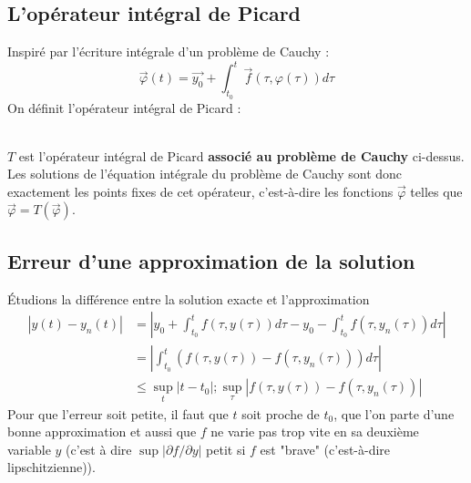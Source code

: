 \subsection{L'opérateur intégral de Picard}
Inspiré par l'écriture intégrale d'un problème de Cauchy :
\begin{equation}
	\vec \varphi(t) = \vec{y_0} + \int_{t_0}^t \vec{f}(\tau,\varphi(\tau))d\tau
\end{equation}
On définit l'opérateur intégral de Picard :
	
\ \\
$T$ est l'opérateur intégral de Picard \textbf{associé au problème de Cauchy}
ci-dessus. Les solutions de l'équation intégrale du problème de Cauchy sont donc 
exactement les points fixes de cet opérateur, c'est-à-dire les fonctions 
$\vec{\varphi}$ telles que $\vec \varphi = T(\vec \varphi)$.
	
\setcounter{subsection}{8}
\subsection{Erreur d'une approximation de la solution}
Étudions la différence entre la solution exacte et l'approximation
\begin{equation}
	\begin{array}{ll}
		|y(t) - y_n(t)| & = |y_0 + \int_{t_0}^t f(\tau,y(\tau))d\tau - y_0 - \int_{t_0}^t       
		f(\tau, y_n(\tau))d\tau|\\
		                & = |\int_{t_0}^t (f(\tau,y(\tau)) - f(\tau,y_n(\tau)))d\tau|           \\
		                & \leq \sup_t |t-t_0| ; \sup_\tau |f(\tau,y(\tau)) - f(\tau,y_n(\tau))| 
	\end{array}
\end{equation}
Pour que l'erreur soit petite, il faut que $t$ soit proche de $t_0$, que l'on 
parte d'une bonne approximation et aussi que $f$ ne varie pas trop vite en sa 
deuxième variable $y$ (c'est à dire $\sup |\partial f/\partial y|$ petit si 
$f$ est "brave" (c'est-à-dire lipschitzienne)).
	
